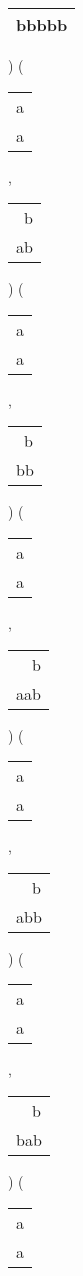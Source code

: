 \begin{description}
\begin{tabular}{|l|}
bbbbb \\
\hline
\end{tabular} 
) 
 ( 
\begin{tabular}{|l|} \hline
a \\
a \\
\hline
\end{tabular} 
 , 
\begin{tabular}{|l|} \hline
\ b \\
ab \\
\hline
\end{tabular} 
) 
 ( 
\begin{tabular}{|l|} \hline
a \\
a \\
\hline
\end{tabular} 
 , 
\begin{tabular}{|l|} \hline
\ b \\
bb \\
\hline
\end{tabular} 
) 
 ( 
\begin{tabular}{|l|} \hline
a \\
a \\
\hline
\end{tabular} 
 , 
\begin{tabular}{|l|} \hline
\ \ b \\
aab \\
\hline
\end{tabular} 
) 
 ( 
\begin{tabular}{|l|} \hline
a \\
a \\
\hline
\end{tabular} 
 , 
\begin{tabular}{|l|} \hline
\ \ b \\
abb \\
\hline
\end{tabular} 
) 
 ( 
\begin{tabular}{|l|} \hline
a \\
a \\
\hline
\end{tabular} 
 , 
\begin{tabular}{|l|} \hline
\ \ b \\
bab \\
\hline
\end{tabular} 
) 
 ( 
\begin{tabular}{|l|} \hline
a \\
a \\
\hline
\end{tabular} 

\end{description}
